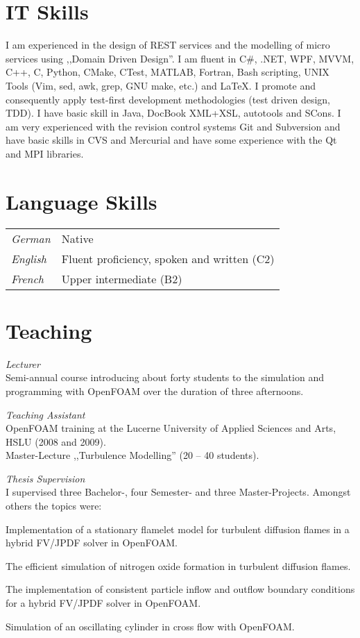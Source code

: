 \documentclass[line,11pt,a4paper]{resume}
\begin{document}
\begin{resume}
\section{\mysidestyle IT Skills}\vspace{2mm}
I am experienced in the design of REST services and the modelling of micro
services using ,,Domain Driven Design''. I am fluent in C\#, .NET, WPF, MVVM,
C++, C, Python, CMake, CTest, MATLAB, Fortran, Bash scripting, UNIX Tools (Vim,
sed, awk, grep, GNU make, etc.) and {\selectfont\LaTeX}.
I promote and consequently apply test-first development methodologies (test
driven design, TDD). I have basic skill in Java, DocBook XML+XSL, autotools and
SCons. I am very experienced with the revision control systems Git and
Subversion and have basic skills in CVS and Mercurial and have some experience
with the Qt and MPI libraries.

\section{\mysidestyle Language Skills}\vspace{2mm}
\begin{tabular}{@{}ll}
  \textsl{German}   & Native \\
  \textsl{English}  & Fluent proficiency, spoken and written (C2) \\
  \textsl{French}  & Upper intermediate (B2) \\
\end{tabular}

\section{\mysidestyle Teaching}\vspace{2mm}

\textsl{Lecturer}\\
Semi-annual course introducing about forty students to the simulation and
programming with OpenFOAM over the duration of three afternoons.

\textsl{Teaching Assistant}\\
OpenFOAM training at the Lucerne University of Applied Sciences and Arts, HSLU
(2008 and 2009). \\
Master-Lecture ,,Turbulence Modelling'' (20 -- 40 students).

\textsl{Thesis Supervision}\\
I supervised three Bachelor-, four Semester- and three Master-Projects. Amongst
others the topics were:
\begin{list2}
  \item Implementation of a stationary flamelet model for turbulent diffusion
    flames in a hybrid FV/JPDF solver in OpenFOAM.
  \item The efficient simulation of nitrogen oxide formation in turbulent
    diffusion flames.
  \item The implementation of consistent particle inflow and outflow boundary
    conditions for a hybrid FV/JPDF solver in OpenFOAM.
  \item Simulation of an oscillating cylinder in cross flow with OpenFOAM.
\end{list2}


\end{resume}
\end{document}
